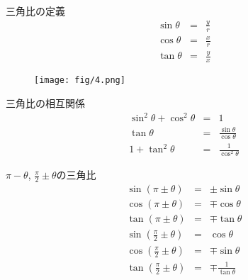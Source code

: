 \documentclass[aspectratio=169, 12pt]{beamer} %
\begin{document}
\begin{frame}{三角比の定義}
    \begin{eqnarray*}
        \sin \theta &=&\frac{y}{r} \\
        \cos \theta &=&\frac{x}{r} \\
        \tan \theta &=&\frac{y}{x}
    \end{eqnarray*}
    \begin{figure}[htbp]
        \begin{center}
            \texttt{[image: fig/4.png]}
        \end{center}
    \end{figure}

\end{frame}
\begin{frame}{三角比の相互関係}
    \begin{eqnarray*}
        \sin^2\theta + \cos^2\theta &=&1 \\
        \tan\theta &=& \frac{\sin\theta}{\cos\theta} \\
        1+\tan^2\theta&=&\frac{1}{\cos^2\theta}
    \end{eqnarray*}
\end{frame}
\begin{frame}{$\pi-\theta$, $\frac{\pi}{2}\pm \theta$の三角比}
    \begin{eqnarray*}
        \sin(\pi\pm\theta)&=&\pm\sin\theta \\
        \cos(\pi\pm\theta)&=&\mp\cos\theta \\
        \tan(\pi\pm\theta)&=&\mp\tan\theta \\
        \sin(\frac{\pi}{2}\pm\theta)&=&\cos\theta \\
        \cos(\frac{\pi}{2}\pm\theta)&=&\mp\sin\theta \\
        \tan(\frac{\pi}{2}\pm\theta)&=&\mp\frac{1}{\tan\theta} \\
    \end{eqnarray*}
\end{frame}
\end{document}
